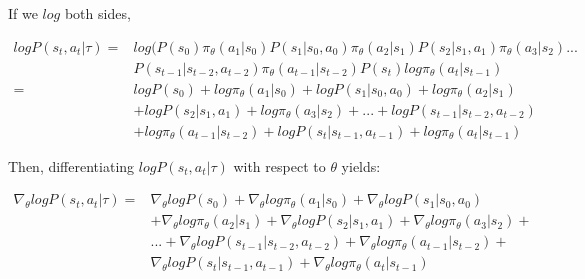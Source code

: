 \documentclass[letterpaper,11pt]{article}
\begin{document}
\vspace{0.2cm}
\noindent If we $log$ both sides, \\
\vspace{-0.2cm}

$$
\begin{aligned}
    log P(s_{t}, a_{t} | \tau)  ={}& log (P(s_{0}) \pi_{\theta}(a_{1} | s_{0}) P(s_{1} | s_{0}, a_{0}) \pi_{\theta}(a_{2} | s_{1}) P(s_{2} | s_{1}, a_{1}) \pi_{\theta}(a_{3} | s_{2}) ... \\
& P(s_{t-1} | s_{t-2}, a_{t-2}) \pi_{\theta}(a_{t-1} | s_{t-2}) P(s_{t})log \pi_{\theta}(a_{t} | s_{t-1}) \\ ={}& log P(s_{0}) + log \pi_{\theta}(a_{1} | s_{0}) + log P(s_{1} | s_{0}, a_{0}) + log \pi_{\theta}(a_{2} | s_{1})\\
& + log P(s_{2} | s_{1}, a_{1}) + log \pi_{\theta}(a_{3} | s_{2}) + ... + log P(s_{t-1} | s_{t-2}, a_{t-2}) \\ 
 & + log \pi_{\theta}(a_{t-1} | s_{t-2}) + log P(s_{t} | s_{t-1}, a_{t-1}) + log \pi_{\theta}(a_{t} | s_{t-1})
\end{aligned}
$$

\vspace{0.2cm}
\noindent Then,  differentiating $log P(s_{t}, a_{t} | \tau)$ with respect to $\theta$ yields: \\
\vspace{-0.15cm}

$$
\begin{aligned}
    \nabla_{\theta} log P(s_{t}, a_{t} | \tau)  ={}& \nabla_{\theta} log P(s_{0}) + \nabla_{\theta} log \pi_{\theta}(a_{1} | s_{0}) + \nabla_{\theta} log P(s_{1} | s_{0}, a_{0}) \\
& + \nabla_{\theta} log \pi_{\theta}(a_{2} | s_{1}) + \nabla_{\theta} log P(s_{2} | s_{1}, a_{1}) + \nabla_{\theta} log \pi_{\theta}(a_{3} | s_{2}) + \\
& ... + \nabla_{\theta} log P(s_{t-1} | s_{t-2}, a_{t-2}) + \nabla_{\theta} log \pi_{\theta}(a_{t-1} | s_{t-2}) + \\ & \nabla_{\theta} log P(s_{t} | s_{t-1}, a_{t-1}) + \nabla_{\theta} log \pi_{\theta}(a_{t} | s_{t-1})  \\
\end{aligned}
$$

\vspace{0.2cm}
\end{document}
